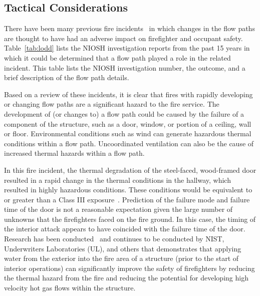 \clearpage

\subsection{Tactical Considerations}
\label{tactical}
There have been many previous fire incidents~\cite{NIOSH:Pettit,NIOSH:Washenitz,NIOSH:Mezzanotte,NIOSH:McFall,NIOSH:McFall2,NIOSH:McFall3,NIOSH:Berardinelli,NIOSH:Koedam,NIOSH:McFall4,NIOSH:Tarley,NIOSH:Braddee,NIOSH:Merinar,NIOSH:Bowyer2,NIOSH:Loflin,NIOSH:Bowyer} in which changes in the flow paths are thought to have had an adverse impact on firefighter and occupant safety. Table~\ref{tab:lodd} lists the NIOSH investigation reports from the past 15 years in which it could be determined that a flow path played a role in the related incident. This table lists the NIOSH investigation number, the outcome, and a brief description of the flow path details.

Based on a review of these incidents, it is clear that fires with rapidly developing or changing flow paths are a significant hazard to the fire service. The development of (or changes to) a flow path could be caused by the failure of a component of the structure, such as a door, window, or portion of a ceiling, wall or floor. Environmental conditions such as wind can generate hazardous thermal conditions within a flow path. Uncoordinated ventilation can also be the cause of increased thermal hazards within a flow path. 

In this fire incident, the thermal degradation of the steel-faced, wood-framed door resulted in a rapid change in the thermal conditions in the hallway, which resulted in highly hazardous conditions. These conditions would be equivalent to or greater than a Class III exposure~\cite{Donnelly2006}. Prediction of the failure mode and failure time of the door is not a reasonable expectation given the large number of unknowns that the firefighters faced on the fire ground.  In this case, the timing of the interior attack appears to have coincided with the failure time of the door. Research has been conducted~\cite{madrzykowski2009fire, kerber2009fire} and continues to be conducted by NIST, Underwriters Laboratories (UL), and others that demonstrates that applying water from the exterior into the fire area of a structure (prior to the start of interior operations) can significantly improve the safety of firefighters by reducing the thermal hazard from the fire and reducing the potential for developing high velocity hot gas flows within the structure.

